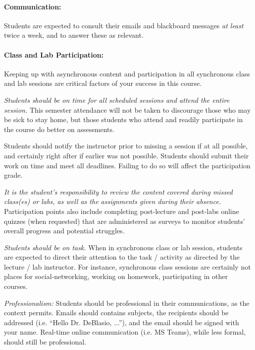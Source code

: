 \documentclass[12pt]{scrartcl}
\begin{document}
\paragraph{Communication:} Students are expected to consult their emails and blackboard messages \textit{at least} twice a week, and to answer these as relevant. 

\paragraph{Class and Lab Participation:} Keeping up with asynchronous content and participation in all synchronous class and lab sessions are critical factors of your success in this course. 

\textit{Students should be on time for all scheduled sessions and attend the entire session.} 
This semester attendance will not be taken to discourage those who may be sick to stay home, 
but those students who attend and readily participate in the course do better on assessments.

Students should notify the instructor prior to missing a session if at all possible, and certainly right after if earlier was not possible. 
Students should submit their work on time and meet all deadlines. Failing to do so will affect the participation grade.


\textit{It is the student's responsibility to review the content covered during missed class(es) or labs, as well as the assignments given during their absence.}
Participation points also include completing post-lecture and post-labs online quizzes (when requested) that are administered as surveys to monitor students’ overall progress and potential struggles.

\textit{Students should be on task.} 
When in synchronous class or lab session, students are expected to direct their attention to the task / activity as directed by the lecture / lab instructor. 
For instance, synchronous class sessions are certainly not places for social-networking, working on homework, participating in other courses.

\textit{Professionalism:} 
Students should be professional in their communications, as the context permits.
Emails should contains subjects, the recipients should be addressed (i.e. ``Hello Dr. DeBlasio, ...''), and the email should be signed with your name. 
Real-time online communication (i.e. MS Teams), while less formal, should still be professional. 
\end{document}
